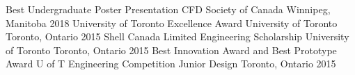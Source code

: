 \begin{cvhonors}
\cvhonor
    {Best Undergraduate Poster Presentation}
    {CFD Society of Canada}
    {Winnipeg, Manitoba}
    {2018}  
\cvhonor
    {University of Toronto Excellence Award}
    {University of Toronto}
    {Toronto, Ontario}
    {2015}   
\cvhonor
    {Shell Canada Limited Engineering Scholarship}
    {University of Toronto}
    {Toronto, Ontario}
    {2015}      
\cvhonor
    {Best Innovation Award and Best Prototype Award}
    {U of T Engineering Competition Junior Design}
    {Toronto, Ontario}
    {2015}    
\end{cvhonors}

